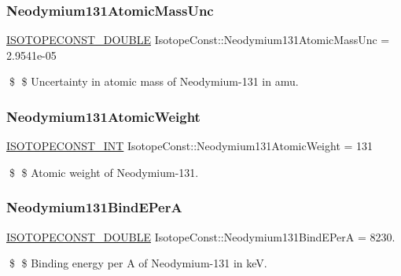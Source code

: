 \subsubsection{\texorpdfstring{Neodymium131\+Atomic\+Mass\+Unc}{Neodymium131AtomicMassUnc}}
{\footnotesize\ttfamily \mbox{\hyperlink{group___isotope_const-_macros_ga8f45a7272ce02c0b4c65c44636ed719a}{I\+S\+O\+T\+O\+P\+E\+C\+O\+N\+S\+T\+\_\+\+D\+O\+U\+B\+LE}} Isotope\+Const\+::\+Neodymium131\+Atomic\+Mass\+Unc = 2.\+9541e-\/05}

\$ \$ Uncertainty in atomic mass of Neodymium-\/131 in amu. \mbox{\label{group___isotope_const-_neodymium-_nd131_ga61a57539ca4e4c3df9f56d10b41f3926}} 
\subsubsection{\texorpdfstring{Neodymium131\+Atomic\+Weight}{Neodymium131AtomicWeight}}
{\footnotesize\ttfamily \mbox{\hyperlink{group___isotope_const-_macros_ga5f18360b3e99483a35c32d789e62621c}{I\+S\+O\+T\+O\+P\+E\+C\+O\+N\+S\+T\+\_\+\+I\+NT}} Isotope\+Const\+::\+Neodymium131\+Atomic\+Weight = 131}

\$ \$ Atomic weight of Neodymium-\/131. \mbox{\label{group___isotope_const-_neodymium-_nd131_ga49272cbe855a43cad6c449ecd535e9ef}} 
\subsubsection{\texorpdfstring{Neodymium131\+Bind\+E\+PerA}{Neodymium131BindEPerA}}
{\footnotesize\ttfamily \mbox{\hyperlink{group___isotope_const-_macros_ga8f45a7272ce02c0b4c65c44636ed719a}{I\+S\+O\+T\+O\+P\+E\+C\+O\+N\+S\+T\+\_\+\+D\+O\+U\+B\+LE}} Isotope\+Const\+::\+Neodymium131\+Bind\+E\+PerA = 8230.}

\$ \$ Binding energy per A of Neodymium-\/131 in keV. \mbox{\label{group___isotope_const-_neodymium-_nd131_ga96ed6aef238d0b45189bb2d772868af1}} 
